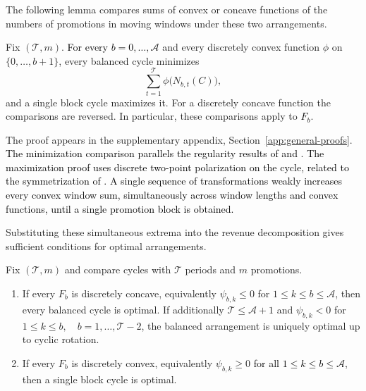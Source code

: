 The following lemma compares sums of convex or concave functions of the numbers of promotions in moving windows under these two arrangements.

\begin{lemma}
\label{lem:overlap-extrema}
Fix \((\mathcal T,m)\). \textcolor{black}{For every \(b=0,\ldots,\mathcal A\)} and every discretely convex function \(\phi\) on \(\{0,\ldots,b+1\}\), every balanced cycle minimizes
\[
 \sum_{t=1}^{\mathcal T}\phi\bigl(N_{b,t}(C)\bigr),
\]
and a single block cycle maximizes it. For a discretely concave function the comparisons are reversed. In particular, these comparisons apply to \textcolor{black}{\(F_b\)}.
\end{lemma}

The proof appears in the supplementary appendix, Section~\ref{app:general-proofs}.
\textcolor{black}{The minimization comparison parallels the regularity results of \citet{hajek1985extremal} and \citet{altman2000multimodularity}. The maximization proof uses discrete two-point polarization on the cycle, related to the symmetrization of \citet{baernstein1976rearrangements}. A single sequence of transformations weakly increases every convex window sum, simultaneously across window lengths and convex functions, until a single promotion block is obtained.}

Substituting these simultaneous extrema into the revenue decomposition gives sufficient conditions for optimal arrangements.

\begin{theorem}
\label{thm:general-sign-arrangement}
Fix \((\mathcal T,m)\) and compare cycles with \(\mathcal T\) periods and \(m\) promotions.
\begin{enumerate}[label=(\roman*)]
 \item If every \(F_b\) is discretely concave, equivalently \(\psi_{b,k}\le0\) for \(1\le k\le b\le\mathcal A\), then every balanced cycle is optimal. If additionally \(\mathcal T\le\mathcal A+1\) and \(\psi_{b,k}<0\) for \(1\le k\le b,\quad b=1,\ldots,\mathcal T-2\), the balanced arrangement is uniquely optimal up to cyclic rotation.
 \item If every \(F_b\) is discretely convex, equivalently \(\psi_{b,k}\ge0\) \textcolor{black}{for all \(1\le k\le b\le\mathcal A\)}, then a single block cycle is optimal.
\end{enumerate}
\end{theorem}

